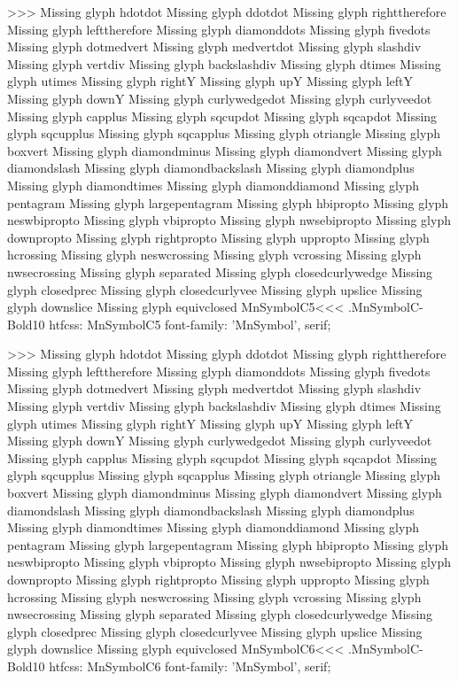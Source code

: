 >>>
Missing glyph	hdotdot
Missing glyph	ddotdot
Missing glyph	righttherefore
Missing glyph	lefttherefore
Missing glyph	diamonddots
Missing glyph	fivedots
Missing glyph	dotmedvert
Missing glyph	medvertdot
Missing glyph	slashdiv
Missing glyph	vertdiv
Missing glyph	backslashdiv
Missing glyph	dtimes
Missing glyph	utimes
Missing glyph	rightY
Missing glyph	upY
Missing glyph	leftY
Missing glyph	downY
Missing glyph	curlywedgedot
Missing glyph	curlyveedot
Missing glyph	capplus
Missing glyph	sqcupdot
Missing glyph	sqcapdot
Missing glyph	sqcupplus
Missing glyph	sqcapplus
Missing glyph	otriangle
Missing glyph	boxvert
Missing glyph	diamondminus
Missing glyph	diamondvert
Missing glyph	diamondslash
Missing glyph	diamondbackslash
Missing glyph	diamondplus
Missing glyph	diamondtimes
Missing glyph	diamonddiamond
Missing glyph	pentagram
Missing glyph	largepentagram
Missing glyph	hbipropto
Missing glyph	neswbipropto
Missing glyph	vbipropto
Missing glyph	nwsebipropto
Missing glyph	downpropto
Missing glyph	rightpropto
Missing glyph	uppropto
Missing glyph	hcrossing
Missing glyph	neswcrossing
Missing glyph	vcrossing
Missing glyph	nwsecrossing
Missing glyph	separated
Missing glyph	closedcurlywedge
Missing glyph	closedprec
Missing glyph	closedcurlyvee
Missing glyph	upslice
Missing glyph	downslice
Missing glyph	equivclosed
\<MnSymbolC5\><<<
.MnSymbolC-Bold10
htfcss:  MnSymbolC5  font-family: 'MnSymbol', serif;

>>>
Missing glyph	hdotdot
Missing glyph	ddotdot
Missing glyph	righttherefore
Missing glyph	lefttherefore
Missing glyph	diamonddots
Missing glyph	fivedots
Missing glyph	dotmedvert
Missing glyph	medvertdot
Missing glyph	slashdiv
Missing glyph	vertdiv
Missing glyph	backslashdiv
Missing glyph	dtimes
Missing glyph	utimes
Missing glyph	rightY
Missing glyph	upY
Missing glyph	leftY
Missing glyph	downY
Missing glyph	curlywedgedot
Missing glyph	curlyveedot
Missing glyph	capplus
Missing glyph	sqcupdot
Missing glyph	sqcapdot
Missing glyph	sqcupplus
Missing glyph	sqcapplus
Missing glyph	otriangle
Missing glyph	boxvert
Missing glyph	diamondminus
Missing glyph	diamondvert
Missing glyph	diamondslash
Missing glyph	diamondbackslash
Missing glyph	diamondplus
Missing glyph	diamondtimes
Missing glyph	diamonddiamond
Missing glyph	pentagram
Missing glyph	largepentagram
Missing glyph	hbipropto
Missing glyph	neswbipropto
Missing glyph	vbipropto
Missing glyph	nwsebipropto
Missing glyph	downpropto
Missing glyph	rightpropto
Missing glyph	uppropto
Missing glyph	hcrossing
Missing glyph	neswcrossing
Missing glyph	vcrossing
Missing glyph	nwsecrossing
Missing glyph	separated
Missing glyph	closedcurlywedge
Missing glyph	closedprec
Missing glyph	closedcurlyvee
Missing glyph	upslice
Missing glyph	downslice
Missing glyph	equivclosed
\<MnSymbolC6\><<<
.MnSymbolC-Bold10
htfcss:  MnSymbolC6  font-family: 'MnSymbol', serif;

